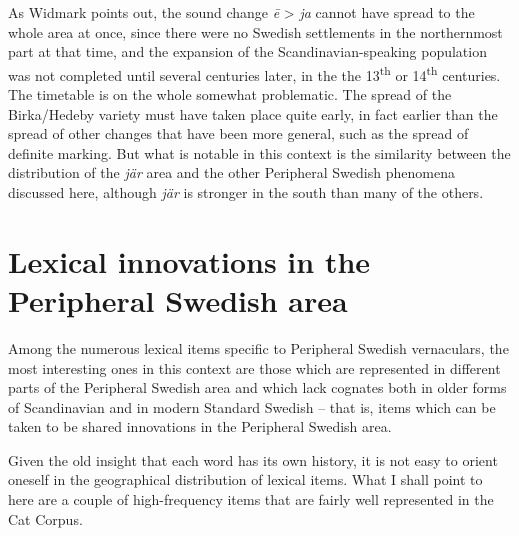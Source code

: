 \begin{stylecaption}
As Widmark points out, the sound change \textit{\=e }{\textgreater} \textit{ja }cannot have spread to the whole area at once, since there were no Swedish settlements in the northernmost part at that time, and the expansion of the Scandinavian-speaking population was not completed until several centuries later, in the the 13\textsuperscript{th} or 14\textsuperscript{th} centuries. The timetable is on the whole somewhat problematic. The spread of the Birka/Hedeby variety must have taken place quite early, in fact earlier than the spread of other changes that have been more general, such as the spread of definite marking. But what is notable in this context is the similarity between the distribution of the \textit{jär }area and the other Peripheral Swedish phenomena discussed here, although \textit{jär} is stronger in the south than many of the others. 

\end{stylecaption}

\begin{figure}[h]

\begin{minipage}{5.8752in}

\end{minipage}

\end{figure}
\section{\rmfamily\bfseries Lexical innovations in the Peripheral Swedish area}

\begin{styleBodytextC}
Among the numerous lexical items specific to Peripheral Swedish vernaculars, the most interesting ones in this context are those which are represented in different parts of the Peripheral Swedish area and which lack cognates both in older forms of Scandinavian and in modern Standard Swedish – that is, items which can be taken to be shared innovations in the Peripheral Swedish area. 

\end{styleBodytextC}

\begin{styleBodytextC}
Given the old insight that each word has its own history, it is not easy to orient oneself in the geographical distribution of lexical items. What I shall point to here are a couple of high-frequency items that are fairly well represented in the Cat Corpus.

\end{styleBodytextC}

